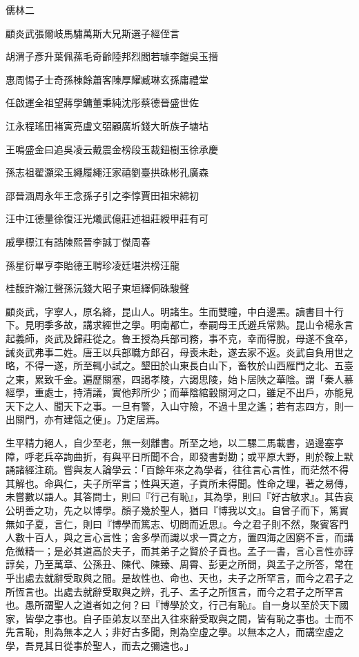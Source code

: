 
\begin{pinyinscope}
儒林二

顧炎武張爾岐馬驌萬斯大兄斯選子經侄言

胡渭子彥升葉佩蓀毛奇齡陸邦烈閻若璩李鎧吳玉搢

惠周惕子士奇孫棟餘蕭客陳厚耀臧琳玄孫庸禮堂

任啟運全祖望蔣學鏞董秉純沈彤蔡德晉盛世佐

江永程瑤田褚寅亮盧文弨顧廣圻錢大昕族子塘坫

王鳴盛金曰追吳凌云戴震金榜段玉裁鈕樹玉徐承慶

孫志祖翟灝梁玉繩履繩汪家禧劉臺拱硃彬孔廣森

邵晉涵周永年王念孫子引之李惇賈田祖宋綿初

汪中江德量徐復汪光爔武億莊述祖莊綬甲莊有可

戚學標江有誥陳熙晉李誠丁傑周春

孫星衍畢亨李貽德王聘珍凌廷堪洪榜汪龍

桂馥許瀚江聲孫沅錢大昭子東垣繹侗硃駿聲

顧炎武，字寧人，原名絳，昆山人。明諸生。生而雙瞳，中白邊黑。讀書目十行下。見明季多故，講求經世之學。明南都亡，奉嗣母王氏避兵常熟。昆山令楊永言起義師，炎武及歸莊從之。魯王授為兵部司務，事不克，幸而得脫，母遂不食卒，誡炎武弗事二姓。唐王以兵部職方郎召，母喪未赴，遂去家不返。炎武自負用世之略，不得一遂，所至輒小試之。墾田於山東長白山下，畜牧於山西雁門之北、五臺之東，累致千金。遍歷關塞，四謁孝陵，六謁思陵，始卜居陜之華陰。謂「秦人慕經學，重處士，持清議，實他邦所少；而華陰綰轂關河之口，雖足不出戶，亦能見天下之人、聞天下之事。一旦有警，入山守險，不過十里之遙；若有志四方，則一出關門，亦有建瓴之便」。乃定居焉。

生平精力絕人，自少至老，無一刻離書。所至之地，以二騾二馬載書，過邊塞亭障，呼老兵卒詢曲折，有與平日所聞不合，即發書對勘；或平原大野，則於鞍上默誦諸經注疏。嘗與友人論學云：「百餘年來之為學者，往往言心言性，而茫然不得其解也。命與仁，夫子所罕言；性與天道，子貢所未得聞。性命之理，著之易傳，未嘗數以語人。其答問士，則曰『行己有恥』，其為學，則曰『好古敏求』。其告哀公明善之功，先之以博學。顏子幾於聖人，猶曰『博我以文』。自曾子而下，篤實無如子夏，言仁，則曰『博學而篤志、切問而近思』。今之君子則不然，聚賓客門人數十百人，與之言心言性；舍多學而識以求一貫之方，置四海之困窮不言，而講危微精一；是必其道高於夫子，而其弟子之賢於子貢也。孟子一書，言心言性亦諄諄矣，乃至萬章、公孫丑、陳代、陳臻、周霄、彭更之所問，與孟子之所答，常在乎出處去就辭受取與之間。是故性也、命也、天也，夫子之所罕言，而今之君子之所恆言也。出處去就辭受取與之辨，孔子、孟子之所恆言，而今之君子之所罕言也。愚所謂聖人之道者如之何？曰『博學於文，行己有恥』。自一身以至於天下國家，皆學之事也。自子臣弟友以至出入往來辭受取與之間，皆有恥之事也。士而不先言恥，則為無本之人；非好古多聞，則為空虛之學。以無本之人，而講空虛之學，吾見其日從事於聖人，而去之彌遠也。」


\end{pinyinscope}
